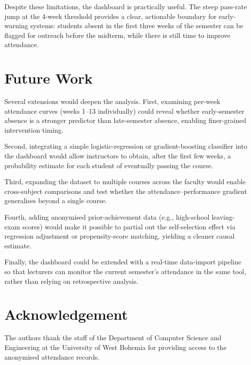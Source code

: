 \documentclass[final,3p,times,twocolumn]{elsarticle}
\begin{document}
Despite these limitations, the dashboard is practically useful.
The steep pass-rate jump at the 4-week threshold provides a clear,
actionable boundary for early-warning systems: students absent in
the first three weeks of the semester can be flagged for outreach
before the midterm, while there is still time to improve attendance.


\section{Future Work}
\label{sec:futurework}

Several extensions would deepen the analysis.
First, examining per-week attendance curves (weeks 1--13 individually)
could reveal whether early-semester absence is a stronger predictor
than late-semester absence, enabling finer-grained intervention timing.

Second, integrating a simple logistic-regression or
gradient-boosting classifier into the dashboard would allow
instructors to obtain, after the first few weeks, a probability
estimate for each student of eventually passing the course.

Third, expanding the dataset to multiple courses across the faculty
would enable cross-subject comparisons and test whether the
attendance--performance gradient generalises beyond a single course.

Fourth, adding anonymised prior-achievement data (e.g., high-school
leaving-exam scores) would make it possible to partial out the
self-selection effect via regression adjustment or propensity-score
matching, yielding a cleaner causal estimate.

Finally, the dashboard could be extended with a real-time data-import
pipeline so that lecturers can monitor the current semester's
attendance in the same tool, rather than relying on retrospective
analysis.


\section*{Acknowledgement}
The authors thank the staff of the Department of Computer Science
and Engineering at the University of West Bohemia for providing
access to the anonymised attendance records.



\end{document}
